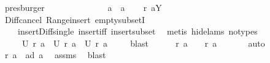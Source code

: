 \begin{isabellebody}
\ presburger\isanewline
\ \ \isacommand{{\isacharbraceleft}}\isamarkupfalse%
\ \isanewline
\ \ \ \ \isamarkupfalse%
\isanewline
\ \ \ \ {}{\isacharcolon}\ {\isachardoublequoteopen}{\isacharquery}a{}{\isasymnoteq}{\isacharbraceleft}{\isacharbraceright}\ {\isacharampersand}\ {\isacharquery}a{}{\isasymnoteq}{\isacharbraceleft}{\isacharbraceright}{\isachardoublequoteclose}\ \isamarkupfalse%
\ \isamarkupfalse%
\ {\isachardoublequoteopen}{\isacharquery}r\ {\isacharquery}a{}{\isasymsupseteq}{\isacharbraceleft}{\isacharquery}Y{\isacharbraceright}{\isachardoublequoteclose}\ \isamarkupfalse%
\ Diff{\isacharunderscore}cancel\ Range{\isacharunderscore}insert\ empty{\isacharunderscore}subsetI\ \isanewline
\ \ \ \ insert{\isacharunderscore}Diff{\isacharunderscore}single\ insert{\isacharunderscore}iff\ insert{\isacharunderscore}subset\ \isamarkupfalse%
\ {\isacharparenleft}metis\ {\isacharparenleft}hide{\isacharunderscore}lams{\isacharcomma}\ no{\isacharunderscore}types{\isacharparenright}{\isacharparenright}\ \isamarkupfalse%
\ \isamarkupfalse%
\ \isanewline
\ \ \ \ {}{\isacharcolon}\ {\isachardoublequoteopen}{\isacharquery}U\ {\isacharparenleft}{\isacharquery}r\ a{\isacharparenright}\ {\isacharequal}\ {\isacharquery}U\ {\isacharparenleft}{\isacharquery}r\ {\isacharquery}a{}{\isacharparenright}\ {\isasymunion}\ {\isacharquery}U\ {\isacharparenleft}{\isacharquery}r\ {\isacharquery}a{}{\isacharparenright}{\isachardoublequoteclose}\ \isamarkupfalse%
\ {}\ \isamarkupfalse%
\ blast\isanewline
\ \ \ \ \isamarkupfalse%
\ {\isachardoublequoteopen}{\isacharquery}r\ {\isacharquery}a{}\ {\isasymnoteq}\ {\isacharbraceleft}{\isacharbraceright}\ {\isacharampersand}\ {\isacharquery}r\ {\isacharquery}a{}\ {\isasymnoteq}\ {\isacharbraceleft}{\isacharbraceright}{\isachardoublequoteclose}\ \isamarkupfalse%
\ {}\ \isamarkupfalse%
\ auto\isanewline
\ \ \ \ \isamarkupfalse%
\ \isamarkupfalse%
\ {\isachardoublequoteopen}{\isacharquery}r\ {\isacharquery}a{}\ {\isasymsubseteq}\ a{\isacharbackquote}{\isacharbackquote}{\isacharparenleft}{\isacharquery}d\ {\isacharquery}a{}{\isacharparenright}{\isachardoublequoteclose}\ \isamarkupfalse%
\ assms\ \isamarkupfalse%
\ blast\isanewline

\end{isabellebody}
